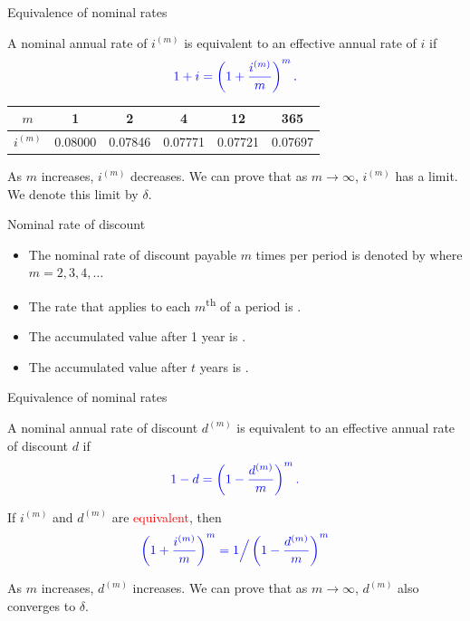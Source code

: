\documentclass{beamer}
\begin{document}
\begin{frame}{Equivalence of nominal rates}

A nominal annual rate of $i^{(m)}$ is equivalent to an effective annual rate of $i$ if
\[
\textcolor{blue}{1 + i = \left(1 + \frac{i^{(m)}}{m}\right)^m.}
\]

\begin{center}
\begin{tabular}{cccccc}
\toprule
$m$ & 1 & 2 & 4 & 12 & 365 \\
\midrule
$i^{(m)}$ & 0.08000 & 0.07846 & 0.07771 & 0.07721 & 0.07697 \\
\bottomrule
\end{tabular}
\end{center}

As $m$ increases, $i^{(m)}$ decreases. We can prove that as $m \to \infty$, $i^{(m)}$ has a limit. We denote this limit by $\delta$.

\end{frame}

\begin{frame}{Nominal rate of discount}

\begin{itemize}
\item The nominal rate of discount payable $m$ times per period is denoted by  where $m = 2, 3, 4, \ldots$
\bigskip
\item The rate that applies to each $m$\textsuperscript{th} of a period is .
\bigskip
\item The accumulated value after 1 year is .
\bigskip
\item The accumulated value after $t$ years is .
\end{itemize}

\end{frame}

\begin{frame}{Equivalence of nominal rates}

A nominal annual rate of discount $d^{(m)}$ is equivalent to an effective annual rate of discount $d$ if
\[
\textcolor{blue}{1 - d = \left(1 - \frac{d^{(m)}}{m}\right)^m.}
\]

If $i^{(m)}$ and $d^{(m)}$ are \textcolor{red}{equivalent}, then
\[
\textcolor{blue}{\left(1 + \frac{i^{(m)}}{m}\right)^m = 1 \Big/ \left(1 - \frac{d^{(m)}}{m}\right)^m}
\]

As $m$ increases, $d^{(m)}$ increases. We can prove that as $m \to \infty$, $d^{(m)}$ also converges to $\delta$.

\end{frame}
\end{document}
